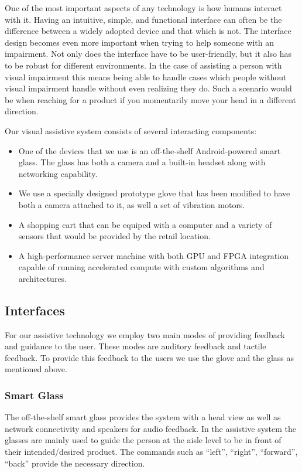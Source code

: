 One of the most important aspects of any technology is how humans interact with it.
Having an intuitive, simple, and functional interface can often be the difference between
a widely adopted device and that which is not. The interface design becomes even more important
when trying to help someone with an impairment. Not only does the interface have to be user-friendly, 
but it also has to be robust for different environments. 
In the case of assisting a person with visual impairment this means being able to handle cases
which people without visual impairment handle without even realizing they do. 
Such a scenario would be when reaching for a product if you momentarily move your head in a different direction.

Our visual assistive system consists of several interacting components: 

\begin{itemize}
\item One of the devices that we use is an off-the-shelf Android-powered smart glass. 
The glass has both a camera and a built-in headset along with
networking capability. 
\item We use a specially designed prototype glove that has been
modified to have both a camera attached to it, as well a set of
vibration motors. 
\item A shopping cart that can be equiped with a computer
and a variety of sensors that would be provided by the retail location.
\item A high-performance server machine with both GPU and FPGA integration capable of running
accelerated compute with custom algorithms and architectures.
\end{itemize}
\subsection{Interfaces}
For our assistive technology we employ two main modes of providing feedback and guidance to the user. These modes are auditory feedback and tactile feedback. 
To provide this feedback to the users we use the glove and the glass as mentioned above.
\subsubsection{Smart Glass}
The off-the-shelf smart glass provides the system with a head view as well as 
network connectivity and speakers for audio feedback.
In the assistive system the glasses are mainly used to guide the person at the aisle level
to be in front of their intended/desired product. The commands such as ``left'', ``right'', ``forward'', ``back''
provide the necessary direction. 
